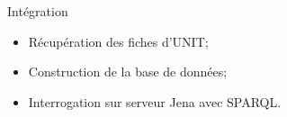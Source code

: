 \begin{frame}{Intégration}
	\begin{itemize}
      \item Récupération des fiches d'UNIT;
      \item Construction de la base de données;
      \item Interrogation sur serveur Jena avec SPARQL.
      
    \end{itemize}	

	
\end{frame}
